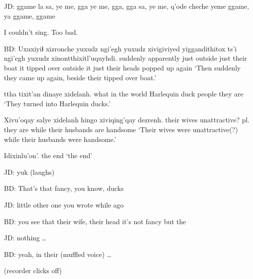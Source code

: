 \documentclass[12pt]{article}
\begin{document}
JD:  ggame la sa, ye me, gga ye me, gga, gga sa, ye me, q'ode cheche yeme ggame, ya ggame, ggame

I couldn't sing. Too bad.

BD:  
\gll Uxuxiyiɬ xizronche yuxudz ngi'egh yuxudz xivigiviyed yiggandithitox ts'i ngi'egh yuxudz xinontthixitl'uquyhdi.
suddenly apparently just outside just {their boat} {it tipped over} {} {outside it} just {their heads popped up again}
\glt `Then suddenly they came up again, beside their tipped over boat.'
\glend

 {ttha tixit'an} dinaye xidelanh.
{what in the world} {Harlequin duck } people {they are}
\glt `They turned into Harlequin ducks.'
\glend

\gll Xivu'oqay salye xidelanh hingo xiviqing'qay dezrenh.
{their wives} {unattractive? pl.} {they are} while {their husbands} {are handsome}
\glt `Their wives were unattractive(?) while their husbands were handsome.'
\glend

\gll Idixinlu'on'.
{{the end}}
\glt `the end'
\glend

JD:  yuk (laughs)

BD:  That's that fancy, you know, ducks

JD:  little other one you wrote while ago

BD:  you see that their wife, their head it's not fancy but the

JD:  nothing \ldots

BD:  yeah, in their (muffled voice) \ldots

(recorder clicks off)
\end{document}
